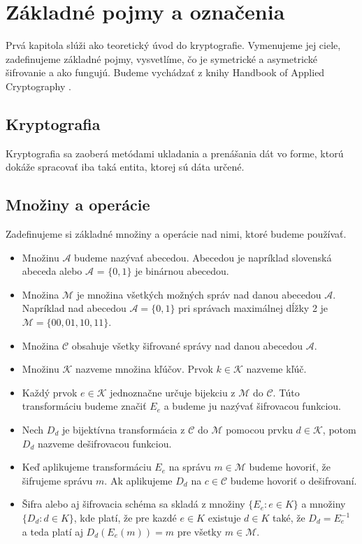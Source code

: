 \chapter{Základné pojmy a označenia}

Prvá kapitola slúži ako teoretický úvod do kryptografie. Vymenujeme jej ciele, zadefinujeme základné pojmy, vysvetlíme, čo je symetrické a asymetrické šifrovanie a ako fungujú. Budeme vychádzať z knihy Handbook of Applied Cryptography \cite{HOAC}.

\section{Kryptografia}
	Kryptografia sa zaoberá metódami ukladania a prenášania dát vo forme, ktorú dokáže spracovať iba taká entita, ktorej sú dáta určené.

\section{Množiny a operácie}
	Zadefinujeme si základné množiny a operácie nad nimi, ktoré budeme používať.
	\begin{itemize}
	\item Množinu $\mathcal A$ budeme nazývať abecedou. Abecedou je napríklad slovenská abeceda alebo $\mathcal A$ =  $\{0,1\}$ je binárnou abecedou.
	\item Množina $\mathcal M$ je množina všetkých možných správ nad danou abecedou $\mathcal A$. Napríklad nad abecedou $\mathcal A = \{0,1\}$ pri správach maximálnej dĺžky 2 je  $ \mathcal M = \{00,01,10,11\}$.
	\item Množina $\mathcal C$ obsahuje všetky šifrované správy nad danou abecedou $\mathcal A$.  
	\item Množinu $\mathcal K$ nazveme množina kľúčov. Prvok $k \in\mathcal K$ nazveme kľúč.
	\item Každý prvok $e \in \mathcal K$ jednoznačne určuje bijekciu z $\mathcal M$ do $\mathcal C$. Túto transformáciu budeme značiť $E_e$ a budeme ju nazývať šifrovacou funkciou.
	\item Nech $D_d$ je bijektívna transformácia z $\mathcal C$ do $\mathcal M$ pomocou prvku  $d \in \mathcal K$, potom  $D_d$ nazveme dešifrovacou funkciou.
	\item Keď aplikujeme transformáciu $E_e$ na správu $m \in \mathcal M$ budeme hovoriť, že šifrujeme správu $m$. Ak aplikujeme $D_d$ na $c \in \mathcal C$ budeme hovoriť o dešifrovaní.
	\item Šifra alebo aj šifrovacia schéma sa skladá z množiny $\{E_e : e \in K\}$ a množiny $\{D_d : d \in K\}$, kde platí, že pre kazdé $e \in K$ existuje $d \in K$ také, že $D_d = E_e^{-1}$ a teda platí aj $D_d(E_e(m)) = m$ pre všetky $m \in \mathcal M$.  
	\end{itemize}

